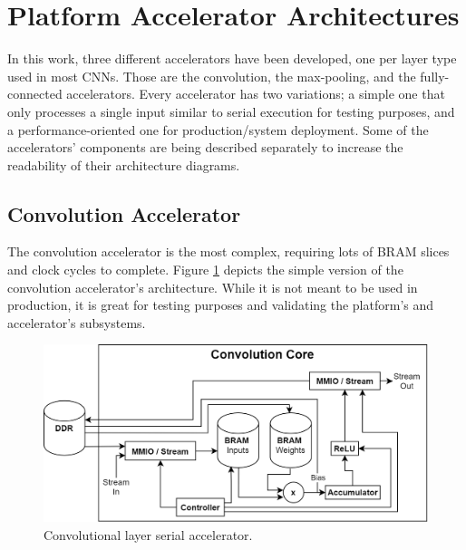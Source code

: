\section{Platform Accelerator Architectures}
\label{sec:Platform-Accelerator-Architectures}
In this work, three different accelerators have been developed, one per layer type used in most CNNs. Those are the convolution, the max-pooling, and the fully-connected accelerators. Every accelerator has two variations; a simple one that only processes a single input similar to serial execution for testing purposes, and a performance-oriented one for production/system deployment. Some of the accelerators' components are being described separately to increase the readability of their architecture diagrams.

\subsection{Convolution Accelerator}
The convolution accelerator is the most complex, requiring lots of BRAM slices and clock cycles to complete. Figure \ref{fig:conv-core-serial} depicts the simple version of the convolution accelerator's architecture. While it is not meant to be used in production, it is great for testing purposes and validating the platform's and accelerator's subsystems.

\begin{figure} [H]
	\centering
	\includegraphics[width=\textwidth]{../Images/Platform/Conv_core_serial.png}
	\decoRule
	\caption[Convolutional layer serial accelerator]{Convolutional layer serial accelerator.}
	\label{fig:conv-core-serial}
\end{figure}

